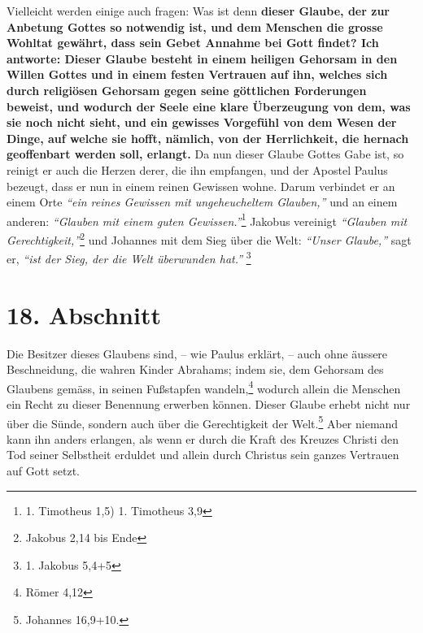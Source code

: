 Vielleicht werden einige auch fragen: Was ist denn \textbf{dieser Glaube, der
zur
Anbetung Gottes so notwendig ist, und dem Menschen die grosse Wohltat gewährt,
dass sein Gebet Annahme bei Gott findet? Ich antworte: Dieser Glaube besteht in
einem heiligen Gehorsam in den Willen Gottes und in einem festen Vertrauen auf
ihn, welches sich durch religiösen Gehorsam gegen
seine göttlichen Forderungen
beweist, und wodurch der Seele eine klare Überzeugung von dem, was sie noch
nicht sieht, und ein gewisses Vorgefühl von dem Wesen der Dinge, auf welche sie
hofft, nämlich, von der Herrlichkeit, die hernach geoffenbart werden soll,
erlangt.} Da nun dieser Glaube Gottes Gabe ist, so reinigt er auch die Herzen
derer, die ihn empfangen, und der Apostel Paulus bezeugt, dass er nun in einem
reinen Gewissen wohne. Darum verbindet er an einem Orte
\textit{"`ein reines Gewissen mit ungeheucheltem Glauben,"'} und an einem
anderen: \textit{"`Glauben mit einem guten
Gewissen."'}\footnote{1. Timotheus 1,5) 1. Timotheus 3,9}
Jakobus vereinigt
\textit{"`Glauben mit Gerechtigkeit,"'}\footnote{Jakobus 2,14 bis Ende}
und Johannes mit dem Sieg über
die Welt:\textit{ "`Unser Glaube,"'} sagt er, \textit{"`ist der Sieg, der die
Welt überwunden hat."'} \footnote{1. Jakobus
5,4+5}

\section{18. Abschnitt} \label{kap6_ab18}

Die Besitzer dieses Glaubens sind, -- wie Paulus erklärt, -- auch ohne äussere
Beschneidung, die wahren Kinder
Abrahams; indem sie, dem Gehorsam des Glaubens
gemäss, in seinen Fußstapfen wandeln,\footnote{Römer 4,12}
wodurch allein die
Menschen ein Recht zu dieser Benennung erwerben können. Dieser Glaube erhebt
nicht nur über die Sünde, sondern auch über die
Gerechtigkeit der Welt.\footnote{Johannes 16,9+10.}
Aber niemand kann ihn anders erlangen, als wenn
er durch die Kraft des Kreuzes Christi den Tod seiner
Selbstheit
erduldet und allein durch Christus sein ganzes Vertrauen auf Gott setzt.

\medskip

